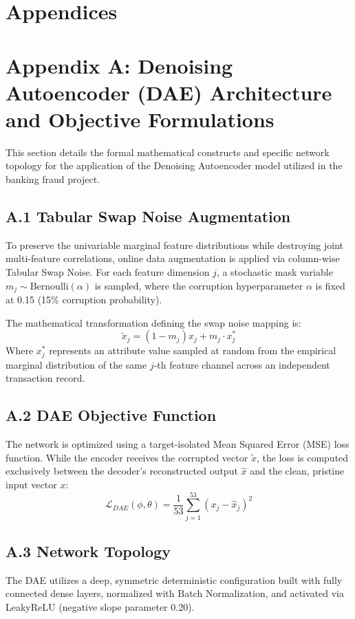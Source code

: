 \documentclass[12pt]{article}
\begin{document}
\section*{Appendices}

\section*{Appendix A: Denoising Autoencoder (DAE) Architecture and Objective Formulations}

This section details the formal mathematical constructs and specific network topology for the application of the Denoising Autoencoder model utilized in the banking fraud project.

\subsection*{A.1 Tabular Swap Noise Augmentation}
To preserve the univariable marginal feature distributions while destroying joint multi-feature correlations, online data augmentation is applied via column-wise Tabular Swap Noise. For each feature dimension $j$, a stochastic mask variable $m_j \sim \text{Bernoulli}(\alpha)$ is sampled, where the corruption hyperparameter $\alpha$ is fixed at 0.15 (15\% corruption probability).

The mathematical transformation defining the swap noise mapping is:
\begin{equation}
    \tilde{x}_{j} = (1 - m_{j})x_{j} + m_{j} \cdot x_{j}^{*}
\end{equation}
Where $x_{j}^{*}$ represents an attribute value sampled at random from the empirical marginal distribution of the same $j$-th feature channel across an independent transaction record.

\subsection*{A.2 DAE Objective Function}
The network is optimized using a target-isolated Mean Squared Error (MSE) loss function. While the encoder receives the corrupted vector $\tilde{x}$, the loss is computed exclusively between the decoder's reconstructed output $\hat{x}$ and the clean, pristine input vector $x$:
\begin{equation}
    \mathcal{L}_{DAE}(\phi,\theta) = \frac{1}{53}\sum_{j=1}^{53}(x_{j} - \hat{x}_{j})^{2}
\end{equation}

\subsection*{A.3 Network Topology}
The DAE utilizes a deep, symmetric deterministic configuration built with fully connected dense layers, normalized with Batch Normalization, and activated via LeakyReLU (negative slope parameter 0.20).
\end{document}
